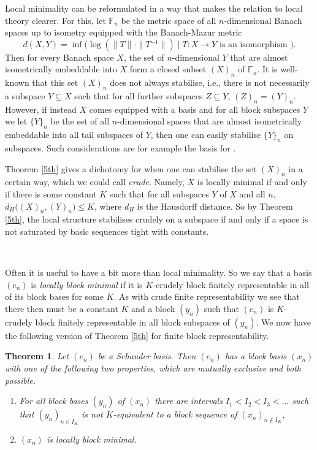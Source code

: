 \documentclass[10pt]{amsart}
\numberwithin{equation}{section}
\newtheorem{thm}{Theorem}[section]
\begin{document}
Local minimality can be reformulated in a way that makes the relation to local
theory clearer. For this, let ${\mathbb F}_n$ be the metric space of all $n$-dimensional
Banach spaces up to isometry equipped with the Banach-Mazur metric
$$
d(X,Y)=\inf\big(\log( \|T\|\cdot\|T{^{-1}}\|){ \; \big| \;} T\colon X{\rightarrow} Y \textrm{ is an isomorphism }\big).
$$
Then for every Banach space $X$, the set of $n$-dimensional $Y$ that are almost
isometrically embeddable into $X$ form a closed subset $(X)_n$ of ${\mathbb F}_n$. It is
well-known that this set $(X)_n$ does not always stabilise, i.e., there is not
necessarily a subspace $Y\subseteq X$ such that for all further subspaces
$Z\subseteq Y$, $(Z)_n=(Y)_n$. However, if instead $X$ comes equipped with a
basis and for all block subspaces $Y$ we let $\{Y\}_n$ be the set of all
$n$-dimensional spaces that are almost isometrically embeddable into all tail
subspaces of $Y$, then one can easily stabilise $\{Y\}_n$ on subspaces. Such
considerations are for example the basis for \cite{MMT}.

Theorem \ref{5th} gives a dichotomy for when one can stabilise the set $(X)_n$
in a certain way, which we could call {\em crude}. Namely, $X$ is locally
minimal if and only if there is some constant $K$ such that for all subspaces
$Y$ of $X$ and all $n$,  $d_H\big((X)_n,(Y)_n\big){\ensuremath{\leqslant}} K$, where $d_H$ is the
Hausdorff distance. So by Theorem \ref{5th}, the local structure stabilises
crudely on a subspace if and only if a space is not saturated by basic
sequences tight with constants.

\

Often it is useful to have a bit more than local minimality. So we say that a
basis $(e_n)$ is {\em locally block minimal} if it is $K$-crudely block
finitely representable in all of its block bases for some $K$. As with crude
finite representability we see that there then must be a constant $K$ and a
block $(y_n)$ such that $(e_n)$ is $K$-crudely block finitely representable in
all  block subspaces of $(y_n)$. We now have the following version of Theorem
\ref{5th} for finite block representability.

\begin{thm}\label{5th block}
Let $(e_n)$ be a Schauder basis. Then $(e_n)$ has a block basis $(x_n)$ with
one of the following two properties, which are mutually exclusive and both
possible.
\begin{enumerate}
 \item For all block bases $(y_n)$ of $(x_n)$ there are intervals
 $I_1<I_2<I_3<\ldots$ such that $(y_n)_{ n\in I_K}$ is not $K$-equivalent
 to a block sequence of $(x_n)_{ n\notin I_K}$,
  \item $(x_n)$ is locally block minimal.
\end{enumerate}
\end{thm}
\end{document}
